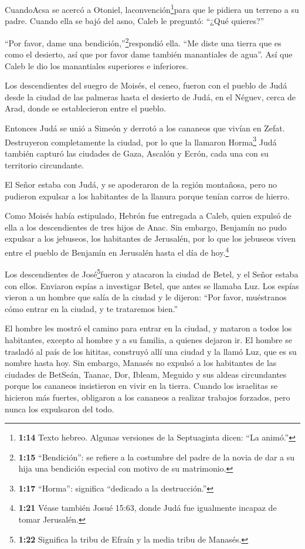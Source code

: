  CuandoAcsa se acercó a Otoniel,
laconvención\footnote{\textbf{1:14} Texto hebreo. Algunas versiones de
  la Septuaginta dicen: ``La animó.''}para que le pidiera un terreno a
su padre. Cuando ella se bajó del asno, Caleb le preguntó: ``¿Qué
quieres?''

 ``Por favor, dame una bendición,''\footnote{\textbf{1:15}
  ``Bendición'': se refiere a la costumbre del padre de la novia de dar
  a su hija una bendición especial con motivo de su matrimonio.}respondió
ella. ``Me diste una tierra que es como el desierto, así que por favor
dame también manantiales de agua''. Así que Caleb le dio los manantiales
superiores e inferiores.

 Los descendientes del suegro de Moisés, el ceneo, fueron
con el pueblo de Judá desde la ciudad de las palmeras hasta el desierto
de Judá, en el Néguev, cerca de Arad, donde se establecieron entre el
pueblo.

 Entonces Judá se unió a Simeón y derrotó a los cananeos
que vivían en Zefat. Destruyeron completamente la ciudad, por lo que la
llamaron Horma\footnote{\textbf{1:17} ``Horma'': significa ``dedicado a
  la destrucción.''}  Judá también capturó las ciudades de
Gaza, Ascalón y Ecrón, cada una con su territorio circundante.

 El Señor estaba con Judá, y se apoderaron de la región
montañosa, pero no pudieron expulsar a los habitantes de la llanura
porque tenían carros de hierro.

 Como Moisés había estipulado, Hebrón fue entregada a
Caleb, quien expulsó de ella a los descendientes de tres hijos de Anac.
 Sin embargo, Benjamín no pudo expulsar a los jebuseos, los
habitantes de Jerusalén, por lo que los jebuseos viven entre el pueblo
de Benjamín en Jerusalén hasta el día de hoy.\footnote{\textbf{1:21}
  Véase también Josué 15:63, donde Judá fue igualmente incapaz de tomar
  Jerusalén.}

 Los descendientes de José\footnote{\textbf{1:22} Significa
  la tribu de Efraín y la media tribu de Manasés.}fueron y atacaron la
ciudad de Betel, y el Señor estaba con ellos.  Enviaron
espías a investigar Betel, que antes se llamaba Luz.  Los
espías vieron a un hombre que salía de la ciudad y le dijeron: ``Por
favor, muéstranos cómo entrar en la ciudad, y te trataremos bien.''

 El hombre les mostró el camino para entrar en la ciudad, y
mataron a todos los habitantes, excepto al hombre y a su familia, a
quienes dejaron ir.  El hombre se trasladó al país de los
hititas, construyó allí una ciudad y la llamó Luz, que es su nombre
hasta hoy.  Sin embargo, Manasés no expulsó a los
habitantes de las ciudades de BetSeán, Taanac, Dor, Ibleam, Meguido y
sus aldeas circundantes porque los cananeos insistieron en vivir en la
tierra.  Cuando los israelitas se hicieron más fuertes,
obligaron a los cananeos a realizar trabajos forzados, pero nunca los
expulsaron del todo.

